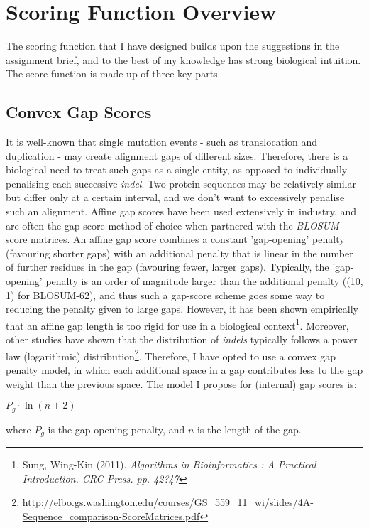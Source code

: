 \documentclass[a4paper]{article}
\begin{document}
\section{Scoring Function Overview}
The scoring function that I have designed builds upon the suggestions in the assignment brief, and to the best of my knowledge has strong biological intuition. The score function is made up of three key parts. 
\subsection{Convex Gap Scores}
It is well-known that single mutation events - such as translocation and duplication - may create alignment gaps of different sizes. Therefore, there is a biological need to treat such gaps as a single entity, as opposed to individually penalising each successive \textit{indel}. Two protein sequences may be relatively similar but differ only at a certain interval, and we don't want to excessively penalise such an alignment. Affine gap scores have been used extensively in industry, and are often the gap score method of choice when partnered with the \textit{BLOSUM} score matrices. An affine gap score combines a constant 'gap-opening' penalty (favouring shorter gaps) with an additional penalty that is linear in the number of further residues in the gap (favouring fewer, larger gaps). Typically, the 'gap-opening' penalty is an order of magnitude larger than the additional penalty ((10, 1) for BLOSUM-62), and thus such a gap-score scheme goes some way to reducing the penalty given to large gaps. However, it has been shown empirically that an affine gap length is too rigid for use in a biological context\footnote{Sung, Wing-Kin (2011). \textit{Algorithms in Bioinformatics : A Practical Introduction. CRC Press. pp. 42?47}}. Moreover, other studies have shown that the distribution of \textit{indels} typically follows a power law (logarithmic) distribution\footnote{\url{http://elbo.gs.washington.edu/courses/GS_559_11_wi/slides/4A-Sequence_comparison-ScoreMatrices.pdf}}. Therefore, I have opted to use a convex gap penalty model, in which each additional space in a gap contributes less to the gap weight than the previous space. The model I propose for (internal) gap scores is:
\begin{center}
$P_g \cdot \ln(n + 2) $
\end {center}
where $P_g$ is the gap opening penalty, and $n$ is the length of the gap. 
\end{document}
